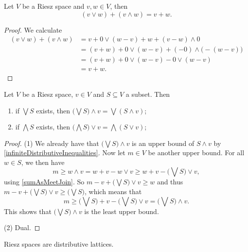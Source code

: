 \begin{proposition} \label{sumAsMeetJoin}
Let $V$ be a Riesz space and $v,w\in V$, then
\[ (v \vee w) + (v \wedge w) = v+w. \]
\end{proposition}
\begin{proof}
We calculate
\begin{align*}
(v \vee w) + (v \wedge w) &= v + 0 \vee (w-v) + w + (v-w)\wedge 0 \\
&= (v + w) + 0 \vee (w-v) + (-0)\wedge \big(-(w-v)\big) \\
&= (v + w) + 0 \vee (w-v) - 0 \vee (w-v) \\
&= v + w.
\end{align*}
\end{proof}

\begin{proposition} \label{distributivityRieszSpaces}
Let $V$ be a Riesz space, $v\in V$ and $S\subseteq V$ a subset. Then
\begin{enumerate}
\item if $\bigvee S$ exists, then $\big(\bigvee S\big) \wedge v = \bigvee (S\wedge v)$;
\item if $\bigwedge S$ exists, then $\big(\bigwedge S\big) \vee v = \bigwedge (S\vee v)$;
\end{enumerate}
\end{proposition}
\begin{proof}
(1) We already have that $\big(\bigvee S\big) \wedge v$ is an upper bound of $S\wedge v$ by \ref{infiniteDistributiveInequalities}. Now let $m\in V$ be another upper bound. For all $w\in S$, we then have
\[ m \geq w\wedge v = w+v - w\vee v \geq w+v - \big(\bigvee S\big)\vee v, \]
using \ref{sumAsMeetJoin}. So $m - v + \big(\bigvee S\big)\vee v \geq w$ and thus $m - v + \big(\bigvee S\big)\vee v \geq \big(\bigvee S\big)$, which means that
\[ m \geq \big(\bigvee S\big) + v - \big(\bigvee S\big)\vee v = \big(\bigvee S\big)\wedge v. \]
This shows that $\big(\bigvee S\big)\wedge v$ is the least upper bound.

(2) Dual.
\end{proof}
\begin{corollary}
Riesz spaces are distributive lattices.
\end{corollary}

